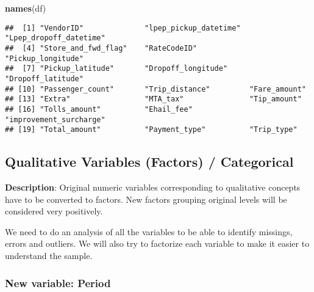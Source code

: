 \documentclass[
  18pt,
  a4paper]{article}
\newenvironment{Shaded}{\begin{snugshade}}{\end{snugshade}}
\newcommand{\KeywordTok}[1]{\textcolor[rgb]{0.13,0.29,0.53}{\textbf{#1}}}
\newcommand{\NormalTok}[1]{#1}
\begin{document}
\begin{Shaded}
\begin{Highlighting}[]
\KeywordTok{names}\NormalTok{(df)}
\end{Highlighting}
\end{Shaded}

\begin{verbatim}
##  [1] "VendorID"              "lpep_pickup_datetime"  "Lpep_dropoff_datetime"
##  [4] "Store_and_fwd_flag"    "RateCodeID"            "Pickup_longitude"     
##  [7] "Pickup_latitude"       "Dropoff_longitude"     "Dropoff_latitude"     
## [10] "Passenger_count"       "Trip_distance"         "Fare_amount"          
## [13] "Extra"                 "MTA_tax"               "Tip_amount"           
## [16] "Tolls_amount"          "Ehail_fee"             "improvement_surcharge"
## [19] "Total_amount"          "Payment_type"          "Trip_type"
\end{verbatim}

\hypertarget{qualitative-variables-factors-categorical}{%
\subsection{Qualitative Variables (Factors) /
Categorical}\label{qualitative-variables-factors-categorical}}

\textbf{Description}: Original numeric variables corresponding to
qualitative concepts have to be converted to factors. New factors
grouping original levels will be considered very positively.

We need to do an analysis of all the variables to be able to identify
missings, errors and outliers. We will also try to factorize each
variable to make it easier to understand the sample.

\hypertarget{new-variable-period}{%
\subsubsection{New variable: Period}\label{new-variable-period}}
\end{document}
